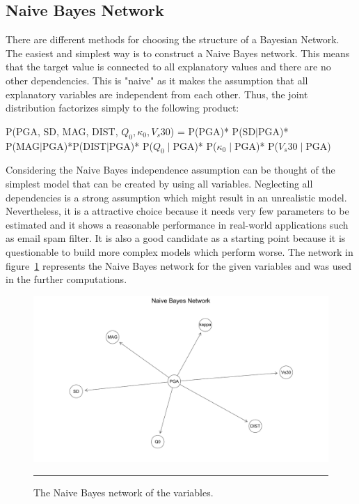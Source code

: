 \newpage

\subsection{Naive Bayes Network}
There are different methods for choosing the structure of a Bayesian Network. The easiest and simplest way is to construct a Naive Bayes network. This means that the target value is connected to all explanatory values and there are no other dependencies. This is "naive" as it makes the assumption that all explanatory variables are independent from each other. Thus, the joint distribution factorizes simply to the following product:

\begin{center}
\small
P(PGA, SD, MAG, DIST, $Q_0, \kappa_0, V_s30$) = P(PGA)* P(SD$\mid$PGA)* \\P(MAG$\mid$PGA)*P(DIST$\mid$PGA)* P($Q_0\mid$PGA)* P($\kappa_0\mid$PGA)* P($V_s30\mid$PGA)\\
\normalsize
\end{center}

Considering the Naive Bayes independence assumption can be thought of the simplest model that can be created by using all variables. Neglecting all dependencies is a strong assumption which might result in an unrealistic model. Nevertheless, it is a attractive choice because it needs very few parameters to be estimated and it shows a reasonable performance in real-world applications such as email spam filter. It is also a good candidate as a starting point because it is questionable to build more complex models which perform worse. The network in figure~\ref{fig:naive} represents the Naive Bayes network for the given variables and was used in the further computations.

\begin{figure}[!htpb]
	\centering
		\includegraphics[scale=0.33]{Figures/naive.pdf}
		\rule{35em}{0.5pt}
	\caption[Naive Bayes Network]{The Naive Bayes network of the variables.}
	\label{fig:naive}
\end{figure}

